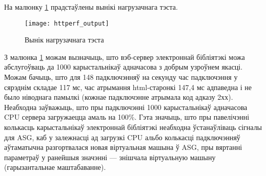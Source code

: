 На малюнку \ref{img: httperf output} прадстаўлены вынікі нагрузачнага тэста.
\begin{figure}[h!]
    \centering
    \texttt{[image: httperf\_output]}
    \caption{Вынік нагрузачнага тэста}
    \label{img: httperf output} 
\end{figure}

З малюнка \ref{img: httperf output} можам вызначыць, што вэб-сервер электроннай
бібліятэкі можа абслугоўваць да 1000 карыстальнікаў адначасова з добрым узроўнем якасці.
Можам бачыць, што для 148 падключэнняў на секунду час падключэння у сярэднім складае 117 мс,
час атрымання html-старонкі 147,4 мс адпаведна і не было ніводнага памылкі (кожнае падключэнне
атрымала код адказу 2хх).
Неабходна заўважыць, што пры падключэнні 1000 карыстальнікаў адначасова CPU сервера загружаецца
амаль на 100\%. Гэта значыць, што пры павелічэнні колькасць карыстальнікаў электроннай бібліятэкі
неабходна ўстанаўліваць сігналы для ASG, каб у залежнасці ад загрузкі CPU альбо колькасці падключэнняў
аўтаматычна разгортвалася новая віртуальная машына ў ASG, пры вяртанні параметраў у ранейшыя значэнні ---
знішчала віртуальную машыну (гарызантальнае маштабаванне).
